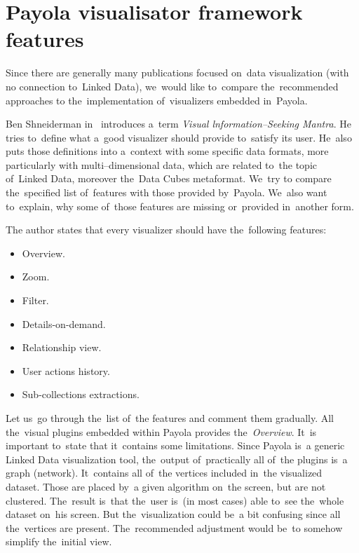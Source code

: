 \section{Payola visualisator framework features}
\label{sec:rw:mantra}
Since there are generally many publications focused on~data visualization (with no
connection to~Linked Data), we~would like to~compare the~recommended approaches to
the~implementation of~visualizers embedded in~Payola.

Ben Shneiderman in~\cite{mantra} introduces a~term \emph{Visual lnformation--Seeking Mantra}.
He tries to~define
what a~good visualizer should provide to~satisfy its user. He~also puts those definitions into
a~context with some specific data formats, more particularly with multi--dimensional data,
which are related to~the topic of~Linked Data, moreover the~Data Cubes metaformat. We~try to
compare the~specified list of~features with those provided by~Payola. We~also want to~explain,
why some of~those features are missing or~provided in~another form.

The author states that every visualizer should have the~following features:

\begin{itemize}
\item Overview.
\item Zoom.
\item Filter.
\item Details-on-demand.
\item Relationship view.
\item User actions history.
\item Sub-collections extractions.
\end{itemize}

Let us~go through the~list of~the features and comment them gradually. All the~visual plugins
embedded within Payola provides the~\emph{Overview}. It~is important to~state
that it~contains some limitations. Since Payola is~a generic Linked Data visualization tool,
the~output of~practically all of~the plugins is~a graph (network). It~contains all of~the vertices
included in~the visualized dataset. Those are placed by~a given algorithm on~the screen,
but are not clustered. The~result is~that the~user is~(in most cases) able to~see the~whole
dataset on~his screen. But the~visualization could be~a bit confusing since all the~vertices
are present. The~recommended adjustment would be~to somehow simplify the~initial view.

